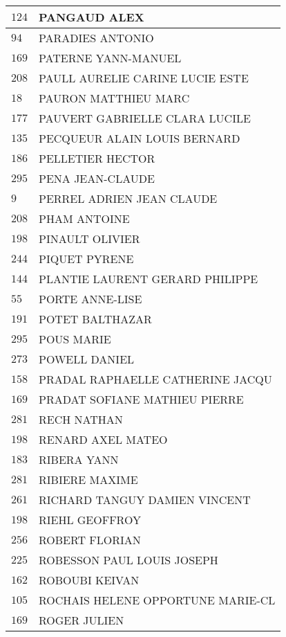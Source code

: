 \begin{xltabular}{\linewidth}{|l|X|}
    \hline
    $124$ & PANGAUD ALEX \\
    \hline
    $94$ & PARADIES ANTONIO \\
    \hline
    $169$ & PATERNE YANN-MANUEL \\
    \hline
    $208$ & PAULL AURELIE CARINE LUCIE ESTE \\
    \hline
    $18$ & PAURON MATTHIEU MARC \\
    \hline
    $177$ & PAUVERT GABRIELLE CLARA LUCILE \\
    \hline
    $135$ & PECQUEUR ALAIN LOUIS BERNARD \\
    \hline
    $186$ & PELLETIER HECTOR \\
    \hline
    $295$ & PENA JEAN-CLAUDE \\
    \hline
    $9$ & PERREL ADRIEN JEAN CLAUDE \\
    \hline
    $208$ & PHAM ANTOINE \\
    \hline
    $198$ & PINAULT OLIVIER \\
    \hline
    $244$ & PIQUET PYRENE \\
    \hline
    $144$ & PLANTIE LAURENT GERARD PHILIPPE \\
    \hline
    $55$ & PORTE ANNE-LISE \\
    \hline
    $191$ & POTET BALTHAZAR \\
    \hline
    $295$ & POUS MARIE \\
    \hline
    $273$ & POWELL DANIEL \\
    \hline
    $158$ & PRADAL RAPHAELLE CATHERINE JACQU \\
    \hline
    $169$ & PRADAT SOFIANE MATHIEU PIERRE \\
    \hline
    $281$ & RECH NATHAN \\
    \hline
    $198$ & RENARD AXEL MATEO \\
    \hline
    $183$ & RIBERA YANN \\
    \hline
    $281$ & RIBIERE MAXIME \\
    \hline
    $261$ & RICHARD TANGUY DAMIEN VINCENT \\
    \hline
    $198$ & RIEHL GEOFFROY \\
    \hline
    $256$ & ROBERT FLORIAN \\
    \hline
    $225$ & ROBESSON PAUL LOUIS JOSEPH \\
    \hline
    $162$ & ROBOUBI KEIVAN \\
    \hline
    $105$ & ROCHAIS HELENE OPPORTUNE MARIE-CL \\
    \hline
    $169$ & ROGER JULIEN \\

\end{xltabular}
